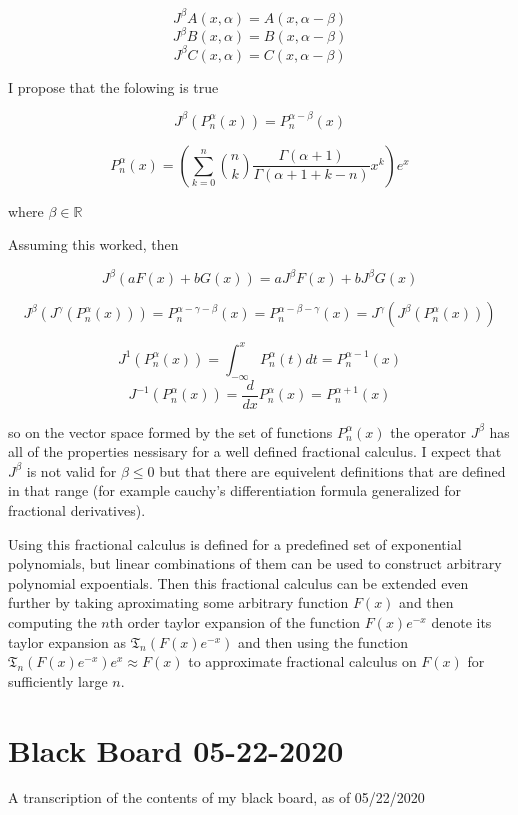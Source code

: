 \documentclass[%
 preprint,
 amsmath, amssymb, aps, pra, 10pt
]{revtex4-2}
\begin{document}
\[J^\beta A(x, \alpha) = A(x, \alpha - \beta)\]
\[J^\beta B(x, \alpha) = B(x, \alpha - \beta)\]
\[J^\beta C(x, \alpha) = C(x, \alpha - \beta)\]

I propose that the folowing is true

\[J^\beta \left(P_n^\alpha(x)\right) = P_n^{\alpha-\beta}(x)\]

\[P_n^\alpha(x) = \left( \sum_{k=0}^n \binom{n}{k}\frac{\Gamma(\alpha + 1)}{\Gamma(\alpha + 1 + k - n)}x^k \right)e^x\]

where $\beta \in \mathbb{R}$

Assuming this worked, then

\[J^\beta \left(a F(x) + b G(x)\right) = a J^\beta F(x) + b J^\beta G(x)\]

\[J^\beta \left(J^\gamma \left( P_n^\alpha(x) \right)\right) = P_n^{\alpha - \gamma - \beta}(x)= P_n^{\alpha - \beta - \gamma}(x) = J^\gamma \left(J^\beta \left( P_n^\alpha(x) \right)\right)\]

\[J^{1} \left(P_n^\alpha(x)\right) = \int_{-\infty}^x P_n^\alpha(t)dt = P_n^{\alpha - 1}(x)\]
\[J^{-1} \left(P_n^\alpha(x)\right) = \frac{d}{dx} P_n^\alpha(x) = P_n^{\alpha + 1}(x)\]

so on the vector space formed by the set of functions $P_n^\alpha(x)$ the operator $J^\beta$ has all of the properties nessisary for a well defined fractional calculus. I expect that $J^\beta$ is not valid for $\beta \le 0$ but that there are equivelent definitions that are defined in that range (for example cauchy's differentiation formula generalized for fractional derivatives).

Using this fractional calculus is defined for a predefined set of exponential polynomials, but linear combinations of them can be used to construct arbitrary polynomial expoentials. Then this fractional calculus can be extended even further by taking aproximating some arbitrary function $F(x)$ and then computing the $n$th order taylor expansion of the function $F(x)e^{-x}$ denote its taylor expansion as $\mathfrak{T}_n\left(F(x)e^{-x}\right)$ and then using the function $\mathfrak{T}_n\left(F(x)e^{-x}\right)e^x \approx F(x)$ to approximate fractional calculus on $F(x)$ for sufficiently large $n$.


\section{Black Board 05-22-2020}

A transcription of the contents of my black board, as of 05/22/2020
\end{document}
